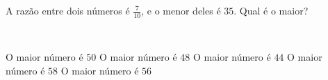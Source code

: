 \parbox{\linewidth}{

A razão entre dois números é $\frac{7}{10}$, e o menor deles é $35$. Qual é o maior?}\vspace{2mm}\\\parbox{\linewidth}{

O maior número é $50$
O maior número é $48$
O maior número é $44$
O maior número é $58$
O maior número é $56$

}

